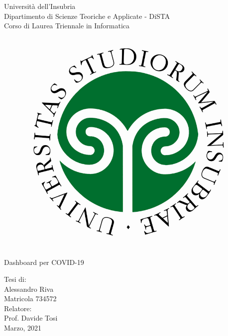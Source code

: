\begin{titlepage}
  \begin{center}
  \begin{large}
  {\fontsize{20}{18}\selectfont\vspace*{0.50cm}Università dell'Insubria}\\
  \vspace{.1cm}
  Dipartimento di Scienze Teoriche e Applicate - DiSTA\\
  \vspace{.1cm}
  Corso di Laurea Triennale in Informatica
  \end{large}
  
  \vspace{1cm}
  \begin{figure}[h]
    \begin{center}
      \includegraphics[scale=0.16]{figure/insubria.png}
    \end{center}
  \end{figure}

    {\fontsize{25}{25}\selectfont\par
    Dashboard per COVID-19}
    \par    
    \vspace{2.4cm}
    \begin{large}
    Tesi di:\\
    Alessandro Riva\\
    Matricola 734572\\
    \vspace{2.3cm}
    Relatore:\\
    Prof. Davide Tosi\\
    \vfill
    Marzo, 2021
    \end{large}
    

  \end{center}
\end{titlepage}